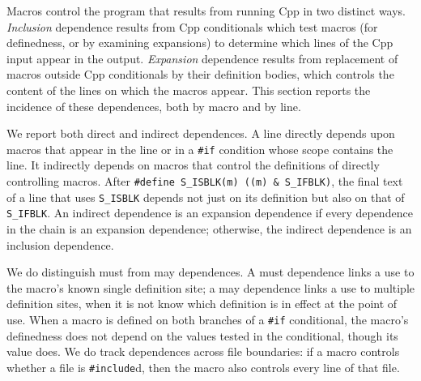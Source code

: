 \documentclass[10pt]{article}
\begin{document}
Macros control the program that results from running Cpp in two distinct
ways.  {\em Inclusion} dependence results from Cpp conditionals which test
macros (for definedness, or by examining expansions) to determine which
lines of the Cpp input appear in the output.  {\em Expansion} dependence
results from replacement of macros outside Cpp conditionals by their
definition bodies, which controls the content of the lines on which the
macros appear.  This section reports the incidence of these dependences,
both by macro and by line.

We report both direct and indirect dependences.  A line directly depends
upon macros that appear in the line or in a {\tt \#if} condition whose
scope contains the line.  It indirectly depends on macros that control the
definitions of directly controlling macros.  After {\tt \#define
\verb|S_ISBLK|(m) ((m)~\&~\verb|S_IFBLK|)}, the final text of a line that
uses \verb|S_ISBLK| depends not just on its definition but also on that of
\verb|S_IFBLK|.  An indirect dependence is an expansion dependence if every
dependence in the chain is an expansion dependence; otherwise, the indirect
dependence is an inclusion dependence.

We do distinguish must from may dependences.  A must dependence links a use
to the macro's known single definition site; a may dependence links a use
to multiple definition sites, when it is not know which definition is in
effect at the point of use.  When a macro is defined on both branches of a
{\tt \#if} conditional, the macro's definedness does not depend on the
values tested in the conditional, though its value does.  We do track
dependences across file boundaries: if a macro controls whether a file is
{\tt \#include}d, then the macro also controls every line of that file.

\end{document}
